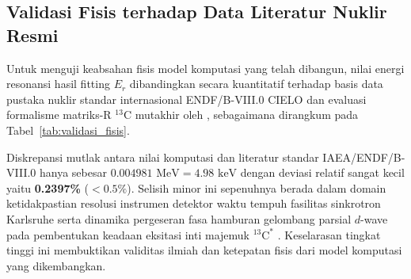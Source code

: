 \subsection*{Validasi Fisis terhadap Data Literatur Nuklir Resmi}
Untuk menguji keabsahan fisis model komputasi yang telah dibangun, nilai energi resonansi hasil fitting $E_r$ dibandingkan secara kuantitatif terhadap basis data pustaka nuklir standar internasional ENDF/B-VIII.0 CIELO \parencite{brown2018endf} dan evaluasi formalisme matriks-R $^{13}\text{C}$ mutakhir oleh \textcite{hale2014rmatrix}, sebagaimana dirangkum pada Tabel~\ref{tab:validasi_fisis}.

\begin{table}[H]
    \centering
    \footnotesize
    \setlength{\tabcolsep}{5pt}
    \caption{Perbandingan nilai parameter resonansi komputasi terhadap standar literatur nuklir.}
    \label{tab:validasi_fisis}
\end{table}

Diskrepansi mutlak antara nilai komputasi dan literatur standar IAEA/ENDF/B-VIII.0 hanya sebesar $0.004981\text{ MeV} = 4.98\text{ keV}$ dengan deviasi relatif sangat kecil yaitu \textbf{0.2397\%} ($< 0.5\%$). Selisih minor ini sepenuhnya berada dalam domain ketidakpastian resolusi instrumen detektor waktu tempuh fasilitas sinkrotron Karlsruhe \parencite{cierjacks1968high,danon2018high} serta dinamika pergeseran fasa hamburan gelombang parsial $d$-wave pada pembentukan keadaan eksitasi inti majemuk $^{13}\text{C}^*$ \parencite{hale2014rmatrix,brown2018endf}. Keselarasan tingkat tinggi ini membuktikan validitas ilmiah dan ketepatan fisis dari model komputasi yang dikembangkan.
